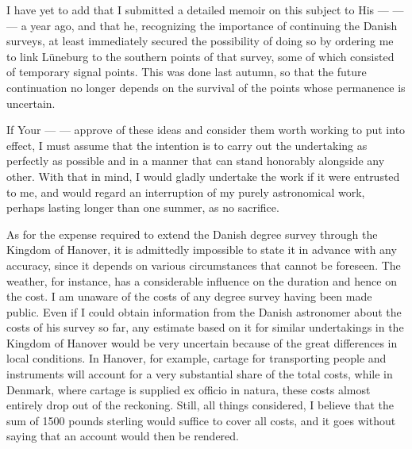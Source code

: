 \par
{}%
I have yet to add that I submitted a detailed memoir on this subject to His — — — a year ago, and that he, recognizing the importance of continuing the Danish surveys, at least immediately secured the possibility of doing so by ordering me to link Lüneburg to the southern points of that survey, some of which consisted of temporary signal points. This was done last autumn, so that the future continuation no longer depends on the survival of the points whose permanence is uncertain.

If Your — — approve of these ideas and consider them worth working to put into effect, I must assume that the intention is to carry out the undertaking as perfectly as possible and in a manner that can stand honorably alongside any other. With that in mind, I would gladly undertake the work if it were entrusted to me, and would regard an interruption of my purely astronomical work, perhaps lasting longer than one summer, as no sacrifice.

As for the expense required to extend the Danish degree survey through the Kingdom of Hanover, it is admittedly impossible to state it in advance with any accuracy, since it depends on various circumstances that cannot be foreseen. The weather, for instance, has a considerable influence on the duration and hence on the cost. I am unaware of the costs of any degree survey having been made public. Even if I could obtain information from the Danish astronomer about the costs of his survey so far, any estimate based on it for similar undertakings in the Kingdom of Hanover would be very uncertain because of the great differences in local conditions. In Hanover, for example, cartage for transporting people and instruments will account for a very substantial share of the total costs, while in Denmark, where cartage is supplied ex officio in natura, these costs almost entirely drop out of the reckoning. Still, all things considered, I believe that the sum of 1500 pounds sterling would suffice to cover all costs, and it goes without saying that an account would then be rendered.

